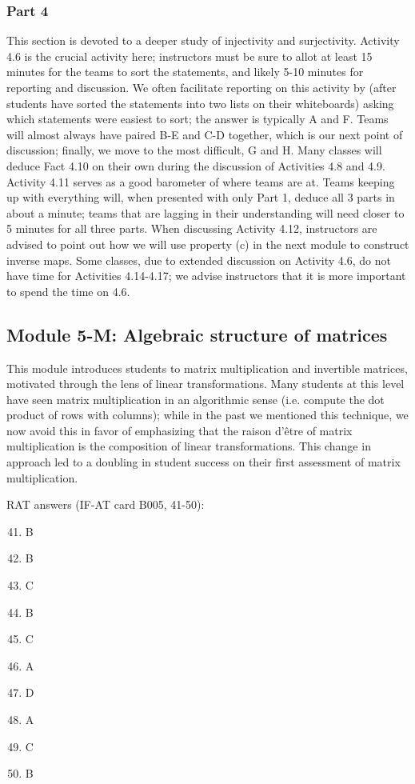\documentclass{article}
\begin{document}
\subsubsection*{Part 4}
This section is devoted to a deeper study of injectivity and surjectivity.  Activity 4.6 is the crucial activity here; instructors must be sure to allot at least 15 minutes for the teams to sort the statements, and likely 5-10 minutes for reporting and discussion.  We often facilitate reporting on this activity by (after students have sorted the statements into two lists on their whiteboards) asking which statements were easiest to sort; the answer is typically A and F.  Teams will almost always have paired B-E and C-D together, which is our next point of discussion; finally, we move to the most difficult, G and H.  Many classes will deduce Fact 4.10 on their own during the discussion of Activities 4.8 and 4.9.  Activity 4.11 serves as a good barometer of where teams are at.  Teams keeping up with everything will, when presented with only Part 1, deduce all 3 parts in about a minute; teams that are lagging in their understanding will need closer to 5 minutes for all three parts.  When discussing Activity 4.12, instructors are advised to point out how we will use property (c) in the next module to construct inverse maps.  Some classes, due to extended discussion on Activity 4.6, do not have time for Activities 4.14-4.17; we advise instructors that it is more important to spend the time on 4.6.

\subsection*{Module 5-M: Algebraic structure of matrices}
This module introduces students to matrix multiplication and invertible matrices, motivated through the lens of linear transformations.  Many students at this level have seen matrix multiplication in an algorithmic sense (i.e. compute the dot product of rows with columns); while in the past we mentioned this technique, we now avoid this in favor of emphasizing that the raison d'\^{e}tre of matrix multiplication is the composition of linear transformations.  This change in approach led to a doubling in student success on their first assessment of matrix multiplication.


RAT answers (IF-AT card B005, 41-50):
\begin{multicols}{10}
\begin{enumerate}[1)]
\setcounter{enumi}{40}
\item B
\item B
\item C
\item B
\item C
\item A
\item D
\item A
\item C
\item B
\end{enumerate}
\end{multicols}
\end{document}
